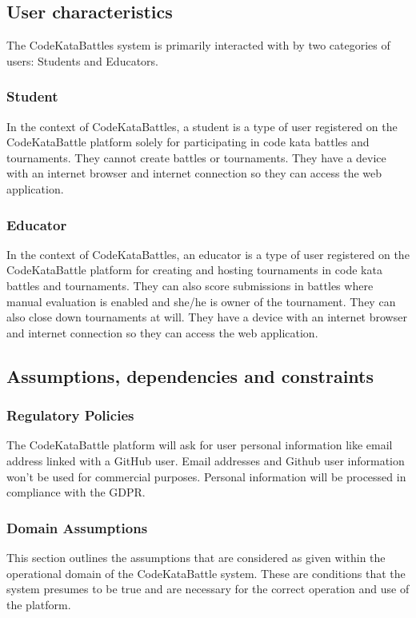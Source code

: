 \subsection{User characteristics}
The CodeKataBattles system is primarily interacted with by two categories of users: Students and Educators.

\subsubsection{Student}
In the context of CodeKataBattles, a student is a type of user registered on the CodeKataBattle platform solely for participating in code kata battles and tournaments. They cannot create battles or tournaments. They have a device with an internet browser and internet connection so they can access the web application. 

\subsubsection{Educator}
In the context of CodeKataBattles, an educator is a type of user registered on the CodeKataBattle platform for creating and hosting tournaments in code kata battles and tournaments. They can also score submissions in battles where manual evaluation is enabled and she/he is owner of the tournament. They can also close down tournaments at will.
They have a device with an internet browser and internet connection so they can access the web application. 


\subsection{Assumptions, dependencies and constraints}

\subsubsection{Regulatory Policies}
The CodeKataBattle platform will ask for user personal information like email address linked with a GitHub user. Email addresses and Github user information won’t be used for commercial purposes. Personal information will be processed in compliance with the GDPR.


\subsubsection{Domain Assumptions}
\label{sec:domain_assumptions}

This section outlines the assumptions that are considered as given within the operational domain of the CodeKataBattle system. These are conditions that the system presumes to be true and are necessary for the correct operation and use of the platform.


